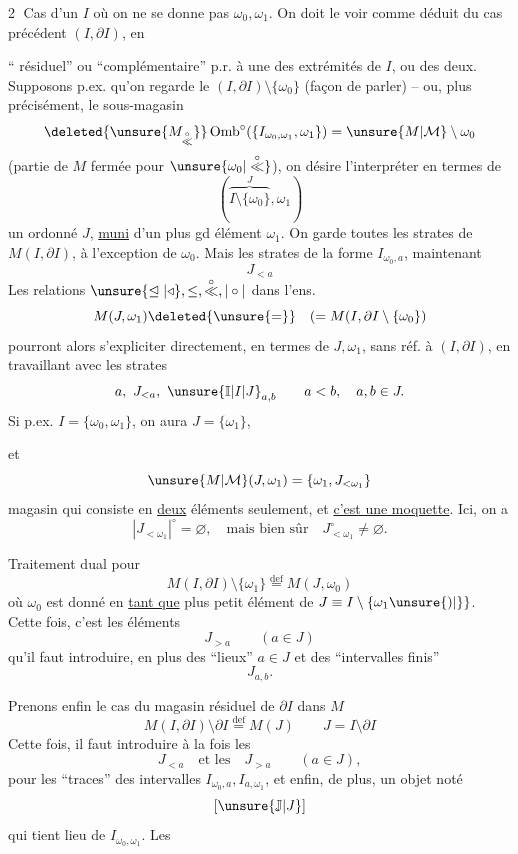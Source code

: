 \textcircled{2} Cas d'un $I$ où on ne se donne pas $\omega_0,\omega_1$. On doit le voir comme déduit du cas précédent $(I,\partial I)$, en 

`` résiduel'' ou ``complémentaire'' p.r. à une des extrémités de $I$, ou des deux. Supposons p.ex.  qu'on regarde le $(I,\partial I)\setminus\{\omega_0\}$ (façon de parler) -- ou, plus précisément, le sous-magasin
\[
\deleted{\unsure{M_{\overset{\circ}{\ll}}}}\operatorname{Omb}^{\circ}(\{I_{\omega_0,\omega_1},\omega_1\})=\unsure{M|\mathcal M}\setminus\omega_0
\]
(partie de $M$ fermée pour $\unsure{\omega_0|\overset{\circ}{\ll}}$), on désire l'interpréter en termes de
\[
(\overbrace{I\setminus\{\omega_0\}}^J,\omega_1)
\]
un ordonné $J$, \uline{muni} d'un plus gd élément $\omega_1$. On garde toutes les strates de $M(I,\partial I)$, à l'exception de $\omega_0$. Mais les strates de la forme  $I_{\omega_0,a}$,  maintenant
\[
J_{<a}
\]
Les relations $\unsure{\trianglelefteq|\triangleleft},\leq,\overset{\circ}{\ll},\mathrel{|\circ|}$  dans l'ens.
\[
M(J,\omega_1)\deleted{\unsure{=}}\quad(=M(I,\partial I\setminus\{\omega_0\})
\]
pourront alors s'expliciter directement, en termes de $J,\omega_1$, sans réf.  à $(I,\partial I)$, en travaillant avec les strates
\[
a,\ J_{<a},\ \unsure{\mathbb I|I|J}_{a,b}\qquad a<b,\quad a,b\in J.
\]
Si p.ex. $I=\{\omega_0,\omega_1\}$, on aura $J=\{\omega_1\}$,

et
\[
\unsure{M|\mathcal M}(J,\omega_1)=\{\omega_1,J_{<\omega_1}\}
\]
magasin qui consiste en \uline{deux} éléments seulement, et \uline{c'est une moquette}. Ici, on a
\[
|J_{<\omega_1}|^{\circ}=\varnothing,\quad\text{mais bien sûr}\quad J^{\circ}_{<\omega_1}\neq\varnothing.
\]

 Traitement dual pour
\[
M(I,\partial I)\setminus\{\omega_1\}\overset{\mathrm{def}}=M(J,\omega_0)
\]
où $\omega_0$ est donné en \uline{tant que} plus petit élément de $J\equiv I\setminus\{\omega_1\unsure{)|\}}$. Cette fois, c'est les éléments
\[
J_{>a}\qquad(a\in J)
\]
qu'il faut introduire, en plus des ``lieux'' $a\in J$ et des ``intervalles finis'' 
\[
J_{a,b}.
\]

Prenons enfin le cas du magasin résiduel de $\partial I$ dans $M$
\[
M(I,\partial I)\setminus\partial I\overset{\mathrm{def}}=M(J)\qquad J=I\setminus\partial I
\]
Cette fois, il faut introduire à la fois les
\[
J_{<a}\quad\text{et les}\quad J_{>a}\qquad(a\in J),
\]
pour les ``traces'' des intervalles  $I_{\omega_0,a},I_{a,\omega_1}$, et  enfin, de plus, un objet noté
\[
[\unsure{\mathbb J|J}]
\]
qui tient lieu de $I_{\omega_0,\omega_1}$. Les 

